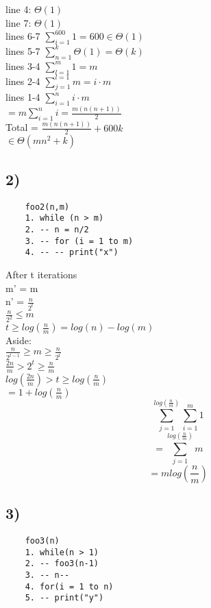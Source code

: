 \documentclass[12pt]{article}
\begin{document}
	line 4: $\Theta(1)$\\
	line 7: $\Theta(1)$\\
	lines 6-7 $\sum_{i=1}^{600}1 = 600 \in \Theta(1)$\\
	lines 5-7 $\sum_{n=1}^{k}\Theta(1) = \Theta(k)$\\
	lines 3-4 $\sum_{l = 1}^m 1 = m$\\
	lines 2-4 $\sum_{j = 1}^{l = 1}m  = i \cdot m$\\
	lines 1-4 $\sum_{i=1}^{n} i \cdot m$\\
	$= m \sum_{i = 1}^{n}i = \frac{m(n(n+1))}{2}$\\
	
	Total = $\frac{m(n(n+1))}{2} + 600k$\\
	$\in \Theta(mn^2 + k)$\\
	
	\subsection*{2)}
	\begin{verbatim}
	foo2(n,m)
	1. while (n > m)
	2. -- n = n/2
	3. -- for (i = 1 to m)
	4. -- -- print("x")
	\end{verbatim}
	
	After t iterations\\
	m' = m\\
	n' = $\frac{n}{2^t}$\\
	$\frac{n}{2^2} \leq m$\\
	
	$t \geq log(\frac{n}{m}) = log(n) - log(m)$\\
	
	Aside:\\
	$\frac{n}{2^{t-1}} \geq m \geq \frac{n}{2^t}$\\
	$\frac{2n}{m} > 2^t \geq \frac{n}{m}$\\
	$log(\frac{2n}{m}) > t \geq log(\frac{n}{m})$\\
	$= 1+ log(\frac{n}{m})$\\
	
	$$\sum_{j=1}^{log(\frac{n}{m})}\sum_{i=1}^{m}1$$
	$$=\sum_{j=1}^{log(\frac{n}{m})}m$$
	$$ = mlog(\frac{n}{m})$$
	
	\subsection*{3)}
	\begin{verbatim}
	foo3(n)
	1. while(n > 1)
	2. -- foo3(n-1)
	3. -- n--
	4. for(i = 1 to n)
	5. -- print("y")
	\end{verbatim}
	
\end{document}
